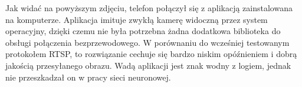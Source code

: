 Jak widać na powyższym zdjęciu, telefon połączył się z aplikacją zainstalowana na komputerze. 
Aplikacja imituje zwykłą kamerę widoczną przez system operacyjny, dzięki czemu nie była potrzebna żadna dodatkowa 
biblioteka do obsługi połączenia bezprzewodowego. 
W porównaniu do wcześniej testowanym protokołem RTSP, to rozwiązanie cechuje się bardzo niskim opóźnieniem i dobrą jakością 
przesyłanego obrazu. Wadą aplikacji jest znak wodny z logiem, jednak nie przeszkadzał on w pracy sieci neuronowej. 